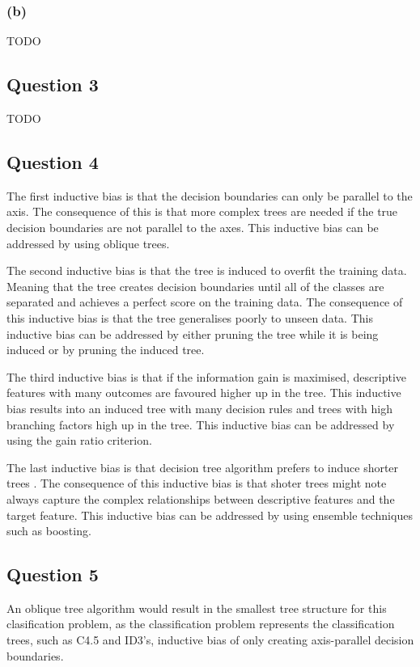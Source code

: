 \documentclass[10pt]{article}
\begin{document}
\subsubsection*{(b)}

TODO

\subsection*{Question 3}

TODO

\subsection*{Question 4}

The first inductive bias is that the decision boundaries can only be parallel to the axis. The
consequence of this is that more complex trees are needed if the true decision boundaries are not
parallel to the axes. This inductive bias can be addressed by using oblique trees.

The second inductive bias is that the tree is induced to overfit the training data. Meaning that
the tree creates decision boundaries until all of the classes are separated and achieves a
perfect score on the training data. The consequence of this inductive bias is that the
tree generalises poorly to unseen data. This inductive bias can be addressed by either pruning the
tree while it is being induced or by pruning the induced tree.

The third inductive bias is that if the information gain is maximised, descriptive features with many
outcomes are favoured higher up in the tree. This inductive bias results into an induced tree with many decision
rules and trees with high branching factors high up in the tree. This inductive bias can be addressed by using
the gain ratio criterion.

The last inductive bias is that decision tree algorithm prefers to induce shorter trees \cite{sectionB-Q4}. The consequence
of this inductive bias is that shoter trees might note always capture the complex relationships between
descriptive features and the target feature. This inductive bias can be addressed by using ensemble techniques
such as boosting.

\subsection*{Question 5}

An oblique tree algorithm would result in the smallest tree structure for this clasification problem,
as the classification problem represents the classification trees, such as C4.5 and ID3's, inductive bias
of only creating axis-parallel decision boundaries.
\end{document}
